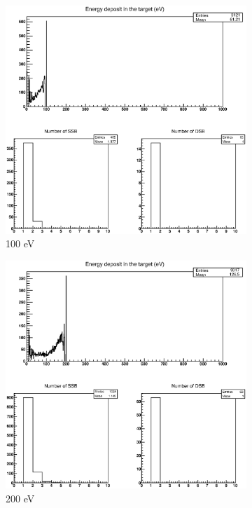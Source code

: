 \begin{figure}
\centering
\begin{subfigure}{.5\textwidth}
  \centering
  \includegraphics[width=.78\linewidth]{./Figures/e-100ev.eps}
  \caption{100 eV}
  \label{fig:subei1}
\end{subfigure}%
\begin{subfigure}{.5\textwidth}
  \centering
  \includegraphics[width=.78\linewidth]{./Figures/e-200ev.eps}
  \caption{200 eV}
  \label{fig:subei2}
\end{subfigure}
\begin{subfigure}{.5\textwidth}
  \centering

\end{subfigure}
\end{figure}
